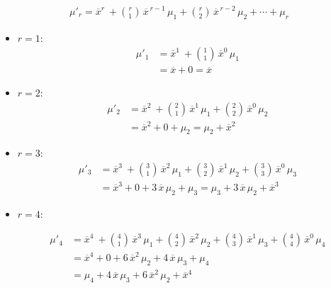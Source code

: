 \documentclass[twoside]{book}
\begin{document}
\begin{textbox}
    \begin{align*}
        \mu'_r = \overline{x}^r\
+ \binom{r}{1}\,\overline{x}^{\,r-1}\,\mu_1
+ \binom{r}{2}\,\overline{x}^{\,r-2}\,\mu_2
+ \cdots
+ \mu_r
    \end{align*}
\end{textbox}

\begin{itemize}
  \item \(r=1:\)
    \begin{align*}
      \mu'_1
      &= \overline{x}^1\ + \binom{1}{1}\,\overline{x}^0\,\mu_1 \\
      &= \overline{x} + 0
      = \overline{x}
    \end{align*}

  \item \(r=2:\)
    \begin{align*}
      \mu'_2
      &= \overline{x}^2\
         + \binom{2}{1}\,\overline{x}^1\,\mu_1
         + \binom{2}{2}\,\overline{x}^0\,\mu_2 \\
      &= \overline{x}^2 + 0 + \mu_2
      = \mu_2 + \overline{x}^2
    \end{align*}

  \item \(r=3:\)
    \begin{align*}
      \mu'_3
      &= \overline{x}^3\
         + \binom{3}{1}\,\overline{x}^2\,\mu_1
         + \binom{3}{2}\,\overline{x}^1\,\mu_2
         + \binom{3}{3}\,\overline{x}^0\,\mu_3 \\
      &= \overline{x}^3 + 0 + 3\,\overline{x}\,\mu_2 + \mu_3
      = \mu_3 + 3\,\overline{x}\,\mu_2 + \overline{x}^3
    \end{align*}

  \item \(r=4:\)

    \begin{align*}
      \mu'_4
      &= \overline{x}^4\
         + \binom{4}{1}\,\overline{x}^3\,\mu_1
         + \binom{4}{2}\,\overline{x}^2\,\mu_2
         + \binom{4}{3}\,\overline{x}^1\,\mu_3
         + \binom{4}{4}\,\overline{x}^0\,\mu_4 \\
      &= \overline{x}^4 + 0 + 6\,\overline{x}^2\,\mu_2 + 4\,\overline{x}\,\mu_3 + \mu_4 \\
      &= \mu_4 + 4\,\overline{x}\,\mu_3 + 6\,\overline{x}^2\,\mu_2 + \overline{x}^4
    \end{align*}
\end{itemize}
\end{document}
